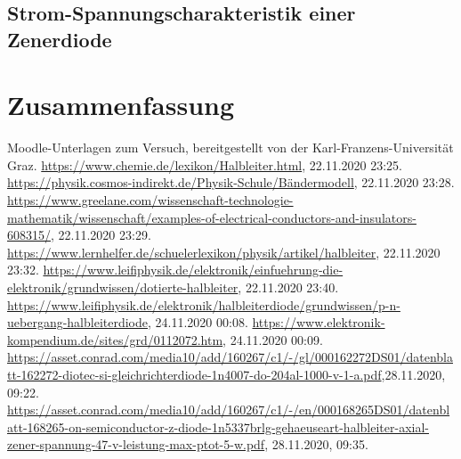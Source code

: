 \documentclass{article}
\begin{document}
\subsection{Strom-Spannungscharakteristik einer Zenerdiode}



\section{Zusammenfassung}




\begin{thebibliography}{9}
 Moodle-Unterlagen zum Versuch, bereitgestellt von der Karl-Franzens-Universität Graz.
 \url{https://www.chemie.de/lexikon/Halbleiter.html}, 22.11.2020 23:25.
 \url{https://physik.cosmos-indirekt.de/Physik-Schule/Bändermodell}, 22.11.2020 23:28.
 \url{https://www.greelane.com/wissenschaft-technologie-mathematik/wissenschaft/examples-of-electrical-conductors-and-insulators-608315/}, 22.11.2020 23:29.
 \url{https://www.lernhelfer.de/schuelerlexikon/physik/artikel/halbleiter}, 22.11.2020 23:32.
 \url{https://www.leifiphysik.de/elektronik/einfuehrung-die-elektronik/grundwissen/dotierte-halbleiter}, 22.11.2020 23:40.
 \url{https://www.leifiphysik.de/elektronik/halbleiterdiode/grundwissen/p-n-uebergang-halbleiterdiode}, 24.11.2020 00:08.
 \url{https://www.elektronik-kompendium.de/sites/grd/0112072.htm}, 24.11.2020 00:09.
 \url{https://asset.conrad.com/media10/add/160267/c1/-/gl/000162272DS01/datenblatt-162272-diotec-si-gleichrichterdiode-1n4007-do-204al-1000-v-1-a.pdf},28.11.2020, 09:22.
 \url{https://asset.conrad.com/media10/add/160267/c1/-/en/000168265DS01/datenblatt-168265-on-semiconductor-z-diode-1n5337brlg-gehaeuseart-halbleiter-axial-zener-spannung-47-v-leistung-max-ptot-5-w.pdf}, 28.11.2020, 09:35.
\end{thebibliography}





\end{document}

